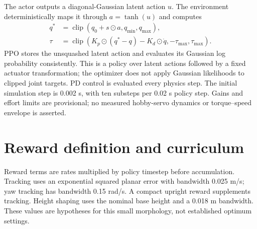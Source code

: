 \documentclass[11pt]{article}
\begin{document}
The actor outputs a diagonal-Gaussian latent action $u$. The environment deterministically maps it through $a=\tanh(u)$ and computes
\begin{align}
q^*&=\operatorname{clip}(q_0+s\odot a,q_{\min},q_{\max}),\\
\tau&=\operatorname{clip}(K_p\odot(q^*-q)-K_d\odot\dot q,-\tau_{\max},\tau_{\max}).
\end{align}
PPO stores the unsquashed latent action and evaluates its Gaussian log probability consistently. This is a policy over latent actions followed by a fixed actuator transformation; the optimizer does not apply Gaussian likelihoods to clipped joint targets. PD control is evaluated every physics step. The initial simulation step is 0.002 s, with ten substeps per 0.02 s policy step. Gains and effort limits are provisional; no measured hobby-servo dynamics or torque--speed envelope is asserted.

\section{Reward definition and curriculum}
Reward terms are rates multiplied by policy timestep before accumulation. Tracking uses an exponential squared planar error with bandwidth 0.025 m/s; yaw tracking has bandwidth 0.15 rad/s. A compact upright reward supplements tracking. Height shaping uses the nominal base height and a 0.018 m bandwidth. These values are hypotheses for this small morphology, not established optimum settings.
\end{document}
